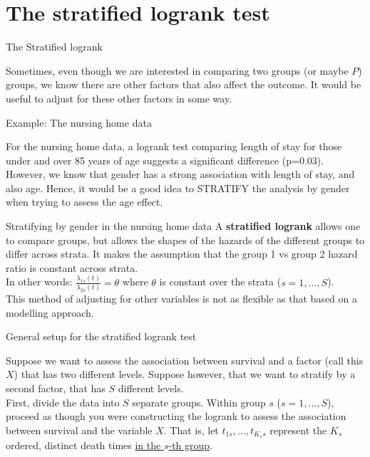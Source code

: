 \documentclass[envcountsect, 10pt, portrait, palatino]{beamer}
\begin{document}
\section{The stratified logrank test}
\begin{frame}{ The Stratified logrank}

Sometimes, even though we are interested in comparing two groups (or
maybe $P$) groups, we know there are other factors that also
affect the outcome.  It would be useful to adjust for these
other factors in some way.
\end{frame}
\begin{frame}{Example: The nursing home data}

For the nursing home data, a logrank test comparing length of stay for those under and over 85 years of age suggests a significant difference (p=0.03).
\\[2ex]
However,  we know that gender has a strong association with
length of stay, and also age.  Hence,  it would be a good idea to STRATIFY the analysis by gender when trying to assess the age effect.
\end{frame} 
\begin{frame}{Stratifying by gender in the nursing home data}
A {\bf stratified logrank} allows one to compare groups, but
allows the shapes of the hazards of the different
groups to differ  across strata.   It makes the assumption that
the group 1 vs group 2 hazard ratio is constant across strata.
\\[2ex]
In other words: $\frac{\lambda_{1s}(t)}{\lambda_{2s}(t)} = \theta$
where $\theta$ is constant over the strata ($s=1,...,S$).
\\[2ex]
This method of adjusting for other variables is not as flexible
as that based on a modelling approach.
\end{frame} 
\begin{frame}{General setup for the stratified logrank test}

Suppose we want to assess the association between survival
and a factor (call this $X$) that has two different levels.  Suppose
however, that we want to stratify by a second factor, that has $S$
different levels.
\\[2ex]
First, divide the data into $S$ separate groups.  Within
group $s$ ($s=1,...,S$), proceed as though you were constructing the logrank
to assess the association between survival and the variable $X$.  That
is, let  $t_{1s},...,t_{K_s s}$ represent the $K_s$ ordered, distinct death
times \underline{in the $s$-th group}.
\end{frame} 
\end{document}
